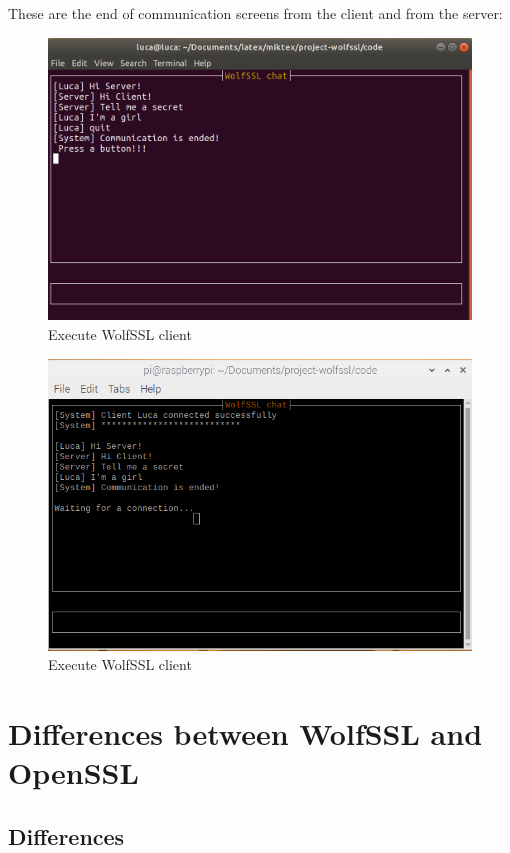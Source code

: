\documentclass[a4paper,12pt]{article}
\begin{document}
These are the end of communication screens from the client and from the server:
\begin{figure}[H]
    \centering
    \includegraphics[scale=0.2]{./code/img/3-client.png}
    \caption{Execute WolfSSL client}
    
\end{figure}
\begin{figure}[H]
    \centering
    \includegraphics[scale=0.45]{./code/img/4-server.png}
    \caption{Execute WolfSSL client}
    
\end{figure}

\section{Differences between WolfSSL and OpenSSL}
\subsection{Differences}
\end{document}
